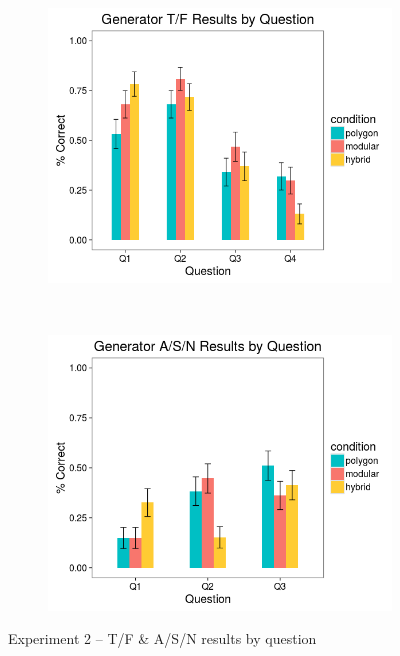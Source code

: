 \documentclass[man,mask,10pt]{apa6}
\begin{document}
\begin{figure}[H]
\centering
\begin{subfigure}[c]{0.45\textwidth}
\centering
\includegraphics[width=\textwidth]{figures/2/gen_TF_by_Q.png}
\end{subfigure}
~
\begin{subfigure}[c]{0.45\textwidth}
\centering
\includegraphics[width=\textwidth]{figures/2/gen_ASN_by_Q.png}
\end{subfigure}
\caption{Experiment 2 -- T/F \& A/S/N results by question}
\end{figure}\noindent 
\end{document}
